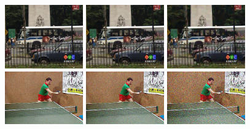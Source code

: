 \documentclass{llncs}
\begin{document}
\begin{figure}[thpb!]
\begin{center}
		\includegraphics[trim=0cm 2cm 4cm 1cm, clip=true, width=0.3\textwidth]{figs/bus_s10_bm4d_044.png}
		\includegraphics[trim=0cm 2cm 4cm 1cm, clip=true, width=0.3\textwidth]{figs/bus_s20_bm4d_044.png}
		\includegraphics[trim=0cm 2cm 4cm 1cm, clip=true, width=0.3\textwidth]{figs/bus_s40_bm4d_044.png}\\
		\includegraphics[trim=3.5cm 2cm 1.5cm .5cm, clip=true, width=0.3\textwidth]{figs/tennis_nisy_s10_140.png}
		\includegraphics[trim=3.5cm 2cm 1.5cm .5cm, clip=true, width=0.3\textwidth]{figs/tennis_nisy_s20_140.png}
		\includegraphics[trim=3.5cm 2cm 1.5cm .5cm, clip=true, width=0.3\textwidth]{figs/tennis_nisy_s40_140.png}\\

\end{center}
\end{figure}
\end{document}
